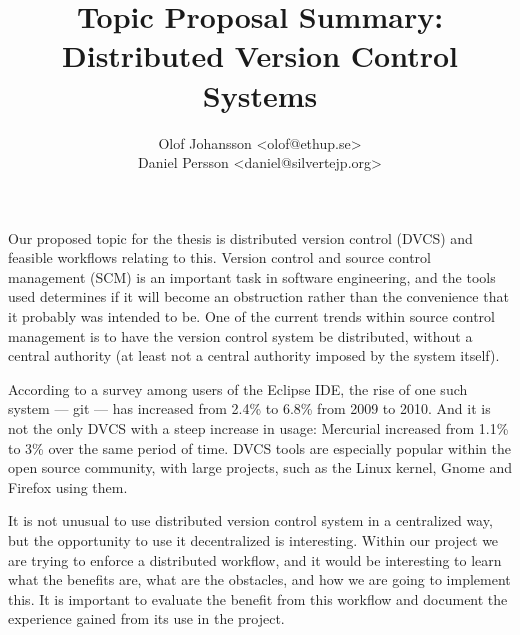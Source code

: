 \documentclass{article}
\title{Topic Proposal Summary: \\ Distributed Version Control Systems}
\author{
	Olof Johansson  \textless olof@ethup.se\textgreater \\
	Daniel Persson \textless daniel@silvertejp.org\textgreater
}
\begin{document}
	\maketitle
	
	Our proposed topic for the thesis is distributed version control (DVCS) 
	and feasible workflows relating to this. Version control and source control
	management (SCM) is an important task in software engineering, and the 
	tools used determines if it will become an obstruction rather than the 
	convenience that it probably was intended to be. One of the current 
	trends within source control management is to have the version control 
	system be distributed\cite{sink10}, without a central authority (at 
	least not a central authority imposed by the system itself). 
	
	According to a survey among users of the Eclipse IDE\cite{eclipse10}, the 
	rise of one such system --- git --- has increased from 2.4\% to 6.8\% from 
	2009 to 2010. And it is not the only DVCS with a steep increase in usage: 
	Mercurial increased from 1.1\% to 3\% over the same period of time. 
	DVCS tools are especially popular within the open source community, 
	with large projects, such as the Linux kernel\cite{kernel-git}, 
	Gnome\cite{gnome-git} and Firefox\cite{firefox-hg} using them.

	It is not unusual to use distributed version control system in a 
	centralized way, but the opportunity to use it decentralized is 
	interesting. Within our project we are trying to enforce a distributed 
	workflow, and it would be interesting to learn what the benefits are, 
	what are the obstacles, and how we are going to implement this. It is
	important to evaluate the benefit from this workflow and document the
	experience gained from its use in the project.

	
	
\end{document}
